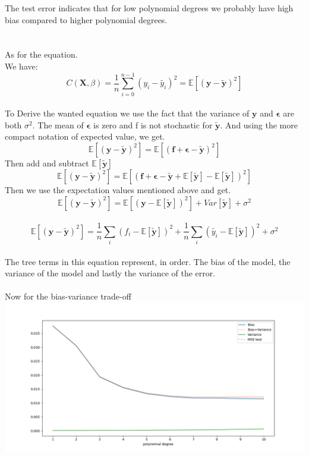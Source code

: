 \documentclass[12pt, letterpaper, twoside]{article}
\begin{document}
The test error indicates that for low polynomial degrees we probably have high bias compared to higher polynomial degrees.\\
\ \\
\ \\
As for the equation.\\
We have:
$$
C(\mathbf{X}, \beta) = \frac{1}{n} \sum_{i=0}^{n-1} (y_i - \tilde{y_i})^2
= \mathbb{E}[(\mathbf{y} - \mathbf{\tilde{y}})^2]
$$
\newpage
\ \\
To Derive the wanted equation we use the fact that the variance of $\mathbf{y}$ and $\mathbf{\epsilon}$ are both $\sigma^2$. The mean of $\mathbf{\epsilon}$ is zero and f is not stochastic for $\mathbf{\tilde{y}}$. And using the more compact notation of expected value, we get.
$$
\mathbb{E}[(\mathbf{y} - \mathbf{\tilde{y}})^2]
=
\mathbb{E}[(\mathbf{f} + \mathbf{\epsilon} - \mathbf{\tilde{y}})^2]
$$
Then add and subtract $\mathbb{E}[\mathbf{\tilde{y}}]$
$$
\mathbb{E}[(\mathbf{y} - \mathbf{\tilde{y}})^2]
=
\mathbb{E}[(\mathbf{f} + \mathbf{\epsilon} - \mathbf{\tilde{y}} + \mathbb{E}[\mathbf{\tilde{y}}] - \mathbb{E}[\mathbf{\tilde{y}}])^2]
$$
Then we use the expectation values mentioned above and get.
$$
\mathbb{E}[(\mathbf{y} - \mathbf{\tilde{y}})^2]
=
\mathbb{E}[(\mathbf{y} - \mathbb{E}[\mathbf{\tilde{y}}])^2]
+ Var[\mathbf{\tilde{y}}]
+ \sigma^2
$$
\ \\
$$
\mathbb{E}[(\mathbf{y} - \mathbf{\tilde{y}})^2]
= 
\frac{1}{n} \sum_i(f_i - \mathbb{E}[\mathbf{\tilde{y}}])^2
+ \frac{1}{n} \sum_i(\tilde{y_i} - \mathbb{E}[\mathbf{\tilde{y}}])^2
+ \sigma^2
$$
\ \\
The tree terms in this equation represent, in order. The bias of the model, the variance of the model and lastly the variance of the error.\\
\newpage
\ \\
Now for the bias-variance trade-off\\
\includegraphics[scale=0.5]{"ex2_bias_variance.png"}\\
\end{document}
